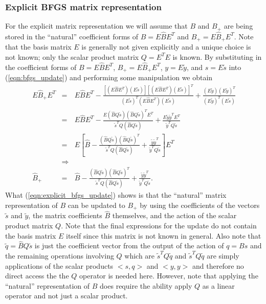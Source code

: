 \subsubsection*{Explicit BFGS matrix representation}

For the explicit matrix representation we will assume that $B$ and $B_+$ are
being stored in the ``natural'' coefficient forms of $B = E {}\hat{B} E^T$
and $B_+ = E {}\hat{B}_+ E^T$.  Note that the basis matrix $E$ is generally
not given explicitly and a unique choice is not known; only the scalar product
matrix $Q = E^T E$ is known.  By substituting in the coefficient forms of $B =
E {}\hat{B} E^T$, $B_+ = E {}\hat{B}_+ E^T$, $y = E {}\tilde{y}$, and $s =
E {}\tilde{s}$ into (\ref{eqn:bfgs_update}) and performing some manipulation
we obtain
%
\begin{eqnarray}
E \hat{B}_+ E^T
& = & E \hat{B} E^T
  - \frac{[(E \hat{B} E^T)(E \tilde{s})][(E \hat{B} E^T)(E \tilde{s})]^T}{(E \tilde{s})^T(E \hat{B} E^T)(E \tilde{s})}
  + \frac{(E \tilde{y})(E \tilde{y})^T}{(E \tilde{y})^T (E \tilde{s})} \nonumber \\
& = & E \hat{B} E^T
  - \frac{E(\hat{B} Q \tilde{s})(\hat{B} Q \tilde{s})^T E^T}{\tilde{s}^T Q (\hat{B} Q \tilde{s})}
  + \frac{E \tilde{y} \tilde{y}^T E^T}{\tilde{y}^T Q \tilde{s}} \nonumber \\
& = & E \left[
  \hat{B}
  - \frac{(\hat{B} Q \tilde{s})(\hat{B} Q \tilde{s})^T}{\tilde{s}^T Q (\hat{B} Q \tilde{s})}
  + \frac{\tilde{y} \tilde{y}^T}{\tilde{y}^T Q \tilde{s}}
  \right] E^T \nonumber \\
& \Rightarrow & \nonumber \\
\hat{B}_+
& = & \hat{B}
  - \frac{(\hat{B} Q \tilde{s})(\hat{B} Q \tilde{s})^T}{\tilde{s}^T Q (\hat{B} Q \tilde{s})}
  + \frac{\tilde{y} \tilde{y}^T}{\tilde{y}^T Q \tilde{s}}.
\label{eqn:explicit_bfgs_update}
\end{eqnarray}
%
What (\ref{eqn:explicit_bfgs_update}) shows is that the ``natural'' matrix
representation of $B$ can be updated to $B_+$ by using the coefficients of the
vectors $\tilde{s}$ and $\tilde{y}$, the matrix coefficients $\hat{B}$
themselves, and the action of the scalar product matrix $Q$.  Note that the
final expressions for the update do not contain the basis matrix $E$ itself
since this matrix is not known in general.  Also note that $\tilde{q} =
{}\hat{B}Q\tilde{s}$ is just the coefficient vector from the output of the
action of $q = B s$ and the remaining operations involving $Q$ which are
$\tilde{s}^T Q\tilde{q}$ and $\tilde{s}^T Q\tilde{q}$ are simply applications
of the scalar products $<s,q>$ and $<y,y>$ and therefore no direct access the
the $Q$ operator is needed here.  However, note that applying the ``natural''
representation of $B$ does require the ability apply $Q$ as a linear operator
and not just a scalar product.

